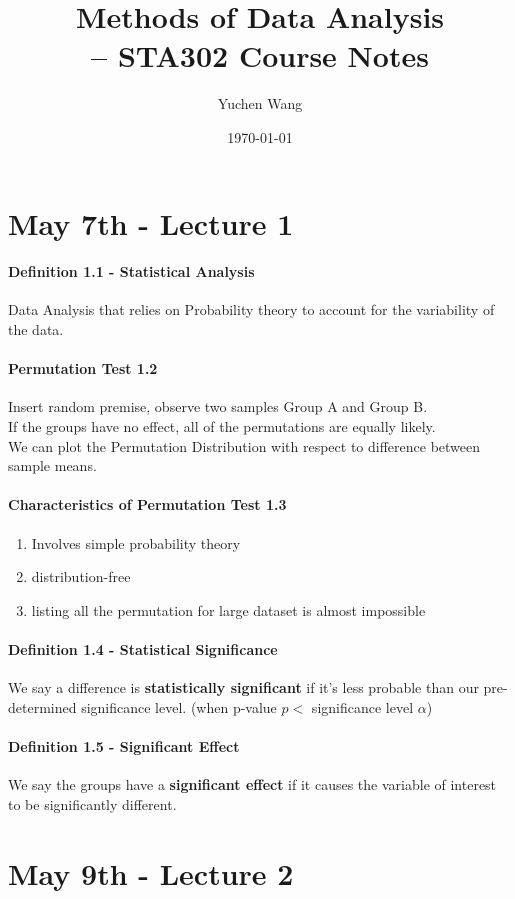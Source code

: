 \documentclass[11pt]{article}
\title{Methods of Data Analysis \\ -- STA302 Course Notes}
\author{Yuchen Wang}
\date{\today}
\begin{document}
    \maketitle
    \tableofcontents
    \newpage
\section{May 7th - Lecture 1}
\paragraph{Definition 1.1 - Statistical Analysis} 
Data Analysis that relies on Probability theory to account for the variability of the data.
\paragraph{Permutation Test 1.2}
Insert random premise, observe two samples Group A and Group B. \\
If the groups have no effect, all of the permutations are equally likely. \\
We can plot the Permutation Distribution with respect to difference between sample means.
\paragraph{Characteristics of Permutation Test 1.3}
\begin{enumerate}
	\item Involves simple probability theory
	\item distribution-free
	\item listing all the permutation for large dataset is almost impossible
\end{enumerate}

\paragraph{Definition 1.4 - Statistical Significance}
We say a difference is \textbf{statistically significant} if it's less probable than our pre-determined significance level. (when p-value $p <$  significance level $\alpha$)
\paragraph{Definition 1.5 - Significant Effect} We say the groups have a \textbf{significant effect} if it causes the variable of interest to be significantly different.

\section{May 9th - Lecture 2}
\end{document}
